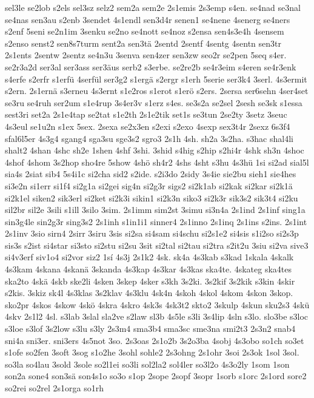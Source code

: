 {sel3le
se2lob
s2els
sel3sz
selz2
sem2a
sem2e
2s1emis
2s3emp
s4en.
se4nad
se3nal
se4nas
sen3au
s2enb
3sendet
4s1endl
sen3d4r
senen1
se4nene
4senerg
se4ners
s2enf
5seni
se2n1im
3senku
se2no
se4nott
se4noz
s2ensa
sen4s3e4h
4sensem
s2enso
senst2
sen8s7turm
sent2a
sen3tä
2sentd
2sentf
4sentg
4sentn
sen3tr
2s1ents
2sentw
2sentz
se4n3u
3senva
sen4zer
sen3zw
seo2r
se2pen
5seq
s4er.
se2r3a2d
ser3al
ser3ass
ser3äus
serb2
s3erbe.
se2re2b
se4r3eim
s4eren
se4r3enk
s4erfe
s2erfr
s1erfü
4serfül
ser3g2
s1ergä
s2ergr
s1erh
5serie
ser3k4
3serl.
4s3ermit
s2ern.
2s1ernä
s3erneu
4s3ernt
s1e2ros
s1erot
s1erö
s2ers.
2sersa
ser6sehn
4ser4set
se3ru
se4ruh
ser2um
s1e4rup
3s4er3v
s1erz
s4es.
se3s2a
se2sel
2sesh
se3sk
s1essa
sest3ri
set2a
2s1e4tap
se2tat
s1e2th
2s1e2tik
set1s
se3tun
2se2ty
3setz
3seuc
4s3eul
se1u2n
s1ex
5sex.
2sexa
se2x3en
s2exi
s2exo
4sexp
sex3t4r
2sexz
6s3f4
sfal6l5er
4s3g4
sgang4
sga3su
sge3s2
sgro3
2s1h
4sh.
sh2a
3s2ha.
s3hac
shal4li
shalt2
4shan
4shc
sh2e
1shen
4shf
3shi.
3shid
s4hig
s2hip
s2hi4r
4shk
sh3n
4shoc
4shof
4shom
3s2hop
sho4re
5show
4shö
sh4r2
4shs
4sht
s3hu
4s3hü
1si
si2ad
sial5l
sia4s
2siat
sib4
5s4i1c
si2cha
sid2
s2ide.
s2i3do
2sidy
3s4ie
sie2bu
sieh1
sie4hes
si3e2n
si1err
si1f4
si2g1a
si2gei
sig4n
si2g3r
sigs2
si2k1ab
si2kak
si2kar
si2k1ä
si2k1el
siken2
sik3erl
si2ket
si2k3i
sikin1
si2k3n
siko3
si2k3r
sik3s2
sik3t4
si2ku
sil2br
sil2e
3sili
s1ill
3silo
3sim.
2s1imm
sim2st
3simu
si3n4a
2s1ind
2s1inf
sing1a
sin3g4le
sin2g3r
sing3s2
2s1inh
s1in1i1
sinner4
2s1inno
2s1inq
2s1ins
s2ins.
2s1int
2s1inv
3sio
sirn4
2sirr
3siru
3sis
si2sa
si4sam
si4schu
si2s1e2
si4sis
s1i2so
si2s3p
sis3s
s2ist
si4star
si3sto
si2stu
si2su
3sit
si2tal
si2tau
si2tra
s2it2u
3siu
si2va
sive3
si4v3erf
siv1o4
si2vor
siz2
1sí
4s3j
2s1k2
4sk.
sk4a
4s3kab
s3kad
1skala
4skalk
4s3kam
4skana
4skanä
3skanda
4s3kap
4s3kar
4s3kas
ska4te.
4skateg
ska4tes
ska2to
4skä
4skb
ske2li
4sken
3skep
4sker
s3kh
3s2ki.
3s2kif
3s2kik
s3kin
4skir
s2kis.
3skiz
sk4l
4s3klas
3s2klav
4s3klu
4sk4n
4skoh
4skol
4skom
4skon
3skop.
sko2pr
4skos
4skow
4skö
4skra
4skro
4sk3s
4sk3t2
skto2
3skulp
4skun
sku2s3
4skü
4skv
2s1l2
4sl.
s3lab
3slal
sla2ve
s2law
sl3b
4s5le
s3li
3s4lip
4sln
s3lo.
slo3be
s3loc
s3loe
s3lof
3s2low
s3lu
s3ly
2s3m4
sma3b4
sma3sc
sme3na
smi2t3
2s3n2
snab4
sni4a
sni3er.
sni3ers
4s5not
3so.
2s3oas
2s1o2b
3s2o3ba
4sobj
4s3obo
so1ch
so3et
s1ofe
so2fen
3soft
3sog
s1o2he
3sohl
sohle2
2s3ohng
2s1ohr
3soi
2s3ok
1sol
3sol.
so3la
so4lau
3sold
3sole
so2l1ei
so3li
sol2la2
sol4ler
so3l2o
4s3o2ly
1som
1son
son2a
sone4
son3sä
son4s1o
so3o
s1op
2sope
2sopf
3sopr
1sorb
s1orc
2s1ord
sore2
so2rei
so2rel
2s1orga
so1rh
}
